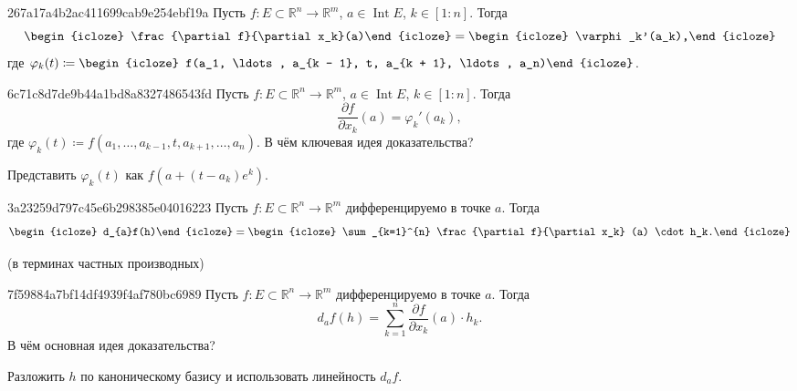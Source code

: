 \begin{note}{267a17a4b2ac411699cab9e254ebf19a}
    Пусть \({ f : E \subset \mathbb R^{n} \to \mathbb R^{m} }\),\: \({ a \in \operatorname{Int} E }\),\: \({ k \in [1 : n] }\).
    Тогда
    \[
        \begin{icloze}{3}\frac{\partial f}{\partial x_k}(a)\end{icloze} = \begin{icloze}{2}\varphi_k'(a_k),\end{icloze}
    \]
    где \({ \varphi_k(t) \coloneqq \begin{icloze}{1}f(a_1, \ldots, a_{k - 1}, t, a_{k + 1}, \ldots, a_n)\end{icloze} }\).
\end{note}

\begin{note}{6c71c8d7de9b44a1bd8a8327486543fd}
    Пусть \({ f : E \subset \mathbb R^{n} \to \mathbb R^{m} }\),\: \({ a \in \operatorname{Int} E }\),\: \({ k \in [1 : n] }\).
    Тогда
    \[
        \frac{\partial f}{\partial x_k}(a) = \varphi_k'(a_k),
    \]
    где \({ \varphi_k(t) \coloneqq f(a_1, \ldots, a_{k - 1}, t, a_{k + 1}, \ldots, a_n) }\).
    В чём ключевая идея доказательства?

    \begin{cloze}{1}
        Представить \({ \varphi_k(t) }\) как \({ f(a + (t - a_k)e^{k}) }\).
    \end{cloze}
\end{note}

\begin{note}{3a23259d797c45e6b298385e04016223}
    Пусть \({ f : E \subset \mathbb R^{n} \to \mathbb R^{m} }\) дифференцируемо в точке \({ a }\).
    Тогда
    \[
        \begin{icloze}{2}d_{a}f(h)\end{icloze} = \begin{icloze}{1}\sum_{k=1}^{n} \frac{\partial f}{\partial x_k} (a) \cdot h_k.\end{icloze}
    \]

    \begin{center}
        \tiny
        (в терминах частных производных)
    \end{center}
\end{note}

\begin{note}{7f59884a7bf14df4939f4af780bc6989}
    Пусть \({ f : E \subset \mathbb R^{n} \to \mathbb R^{m} }\) дифференцируемо в точке \({ a }\).
    Тогда
    \[
        d_{a}f(h) = \sum_{k=1}^{n} \frac{\partial f}{\partial x_k} (a) \cdot h_k.
    \]
    В чём основная идея доказательства?

    \begin{cloze}{1}
        Разложить \({ h }\) по каноническому базису и использовать линейность \({ d_{a}f }\).
    \end{cloze}
\end{note}

